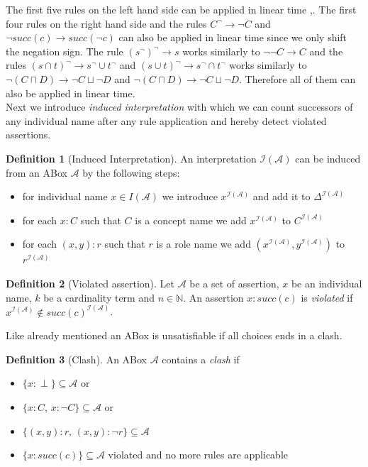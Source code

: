 \documentclass{book}
\theoremstyle{break}
\theoremstyle{definition}
\newtheorem{mydef}{Definition}
\begin{document}
The first five rules on the left hand side can be applied in linear time \cite{1},\cite{6}. The first four rules on the right hand side and the rules $C^\neg\rightarrow \neg C$ and $\neg succ(c)\rightarrow succ(\neg c)$ can also be applied in linear time since we only shift the negation sign. The rule $(s^\neg)^\neg\rightarrow s$ works similarly to $\neg\neg C\rightarrow C$ and the rules $(s\cap t)^\neg\rightarrow s^\neg\cup t^\neg$ and $(s\cup t)^\neg\rightarrow s^\neg \cap t^\neg$ works similarly to $\neg(C\sqcap D)\rightarrow \neg C\sqcup \neg D$ and $\neg(C\sqcap D)\rightarrow \neg C\sqcup \neg D$. Therefore all of them can also be applied in linear time.\\
Next we introduce \textit{induced interpretation} with which we can count successors of any individual name after any rule application and hereby detect violated assertions.
\begin{mydef}[Induced Interpretation]
An interpretation $\mathcal{I}(\mathcal{A})$ can be induced from an ABox $\mathcal{A}$ by the following steps:
\begin{itemize}
\item for individual name $x\in I(\mathcal{A})$ we introduce $x^{\mathcal{I}(\mathcal{A})}$ and add it to $\Delta^{\mathcal{I}(\mathcal{A})}$
\item for each $x:C$ such that $C$ is a concept name we add $x^{\mathcal{I}(\mathcal{A})}$ to $C^{\mathcal{I}(\mathcal{A})}$
\item for each $(x,y):r$ such that $r$ is a role name we add $(x^{\mathcal{I}(\mathcal{A})},y^{\mathcal{I}(\mathcal{A})})$ to $r^{\mathcal{I}(\mathcal{A})}$
\end{itemize}
\end{mydef}
\begin{mydef}[Violated assertion]
Let $\mathcal{A}$ be a set of assertion, $x$ be an individual name, $k$ be a cardinality term and $n\in\mathbb{N}$. An assertion $x:succ(c)$ is \textit{violated} if $x^{\mathcal{I}(\mathcal{A})}\notin succ(c)^{\mathcal{I}(\mathcal{A})}$.
\end{mydef}
Like already mentioned an ABox is unsatisfiable if all choices ends in a clash.
\begin{mydef}[Clash]
An ABox $\mathcal{A}$ contains a \textit{clash} if
\begin{itemize}
\item $\{x:\perp\}\subseteq \mathcal{A}$ or
\item $\{x:C,\,x:\neg C\}\subseteq \mathcal{A}$ or
\item $\{(x,y):r,\,(x,y):\neg r\}\subseteq \mathcal{A}$
\item $\{x:succ(c)\}\subseteq \mathcal{A}$ violated and no more rules are applicable
\end{itemize}
\end{mydef}
\end{document}

